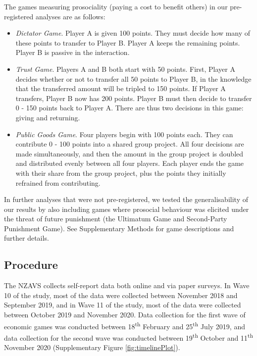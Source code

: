 \documentclass[
  man,floatsintext]{apa6}
\providecommand{\tightlist}{%
  \setlength{\itemsep}{0pt}\setlength{\parskip}{0pt}}
\begin{document}
The games measuring prosociality (paying a cost to benefit others) in our
pre-registered analyses are as follows:

\begin{itemize}
\tightlist
\item
  \emph{Dictator Game}. Player A is given 100 points. They must decide how many of
  these points to transfer to Player B. Player A keeps the remaining points.
  Player B is passive in the interaction.
\item
  \emph{Trust Game}. Players A and B both start with 50 points. First, Player A
  decides whether or not to transfer all 50 points to Player B, in the
  knowledge that the transferred amount will be tripled to 150 points. If
  Player A transfers, Player B now has 200 points. Player B must then decide to
  transfer 0 - 150 points back to Player A. There are thus two decisions in
  this game: giving and returning.
\item
  \emph{Public Goods Game}. Four players begin with 100 points each. They can
  contribute 0 - 100 points into a shared group project. All four decisions are
  made simultaneously, and then the amount in the group project is doubled and
  distributed evenly between all four players. Each player ends the game with
  their share from the group project, plus the points they initially refrained
  from contributing.
\end{itemize}

In further analyses that were not pre-registered, we tested the generalisability
of our results by also including games where prosocial behaviour was elicited
under the threat of future punishment (the Ultimatum Game and Second-Party
Punishment Game). See Supplementary Methods for game descriptions and further
details.

\hypertarget{procedure}{%
\subsection{Procedure}\label{procedure}}

The NZAVS collects self-report data both online and via paper surveys. In Wave
10 of the study, most of the data were collected between November 2018 and
September 2019, and in Wave 11 of the study, most of the data were collected
between October 2019 and November 2020. Data collection for the first wave of
economic games was conducted between 18\textsuperscript{th} February and 25\textsuperscript{th} July 2019, and
data collection for the second wave was conducted between 19\textsuperscript{th} October and
11\textsuperscript{th} November 2020 (Supplementary Figure \ref{fig:timelinePlot}).
\end{document}
